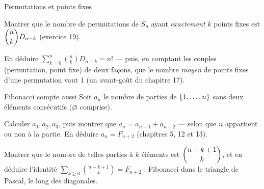 \begin{exercice}[3]{Permutations et points fixes}
\begin{questions}
  \item Montrer que le nombre de permutations de $S_n$ ayant
    \emph{exactement} $k$ points fixes est $\dbinom nk D_{n-k}$
    (exercice 19).
  \item En déduire
    $\displaystyle\sum_{k=0}^{n}\binom nk D_{n-k}=n!$ — puis, en comptant
    les couples (permutation, point fixe) de deux façons, que le nombre
    \emph{moyen} de points fixes d'une permutation vaut $1$
    (un avant-goût du chapitre 17).
\end{questions}
\end{exercice}

\begin{exercice}[3]{Fibonacci compte aussi}
Soit $a_n$ le nombre de parties de $\left\{1,\dots,n\right\}$ sans deux éléments
consécutifs ($\varnothing$ comprise).
\begin{questions}
  \item Calculer $a_1,a_2,a_3$, puis montrer que
    $a_n=a_{n-1}+a_{n-2}$ — selon que $n$ appartient ou non à la partie.
    En déduire $a_n=F_{n+2}$ (chapitres 5, 12 et 13).
  \item Montrer que le nombre de telles parties à $k$ éléments est
    $\dbinom{n-k+1}{k}$, et en déduire l'identité
    $\displaystyle\sum_{k\geqslant0}\binom{n-k+1}{k}=F_{n+2}$ : Fibonacci
    dans le triangle de Pascal, le long des diagonales.
\end{questions}
\end{exercice}


